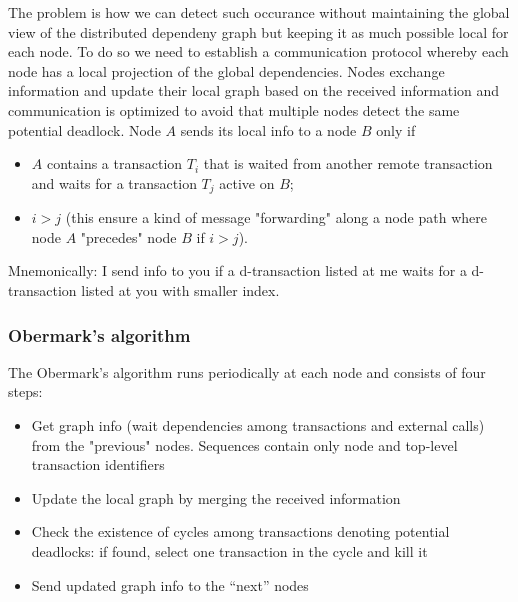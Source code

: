 \newline
The problem is how we can detect such occurance without maintaining the global view of the distributed dependeny graph but keeping it as much possible local for each node. To do so we need to  establish a communication protocol whereby each node has a local projection of the global dependencies. Nodes exchange information and update their local graph based on the received information and communication is optimized to avoid that multiple nodes detect the same potential deadlock.\newline
\newline
Node $A$ sends its local info to a node $B$ only if
\begin{itemize}
    \item $A$ contains a transaction $T_i$ that is waited from another remote transaction and waits for a transaction $T_j$ active on $B$;
    \item $i>j$ (this ensure a kind of message "forwarding" along a node path where node $A$ "precedes" node $B$ if $i>j$).
\end{itemize}
Mnemonically: I send info to you if a d-transaction listed at me waits for a d-transaction listed at you with smaller index.
\subsubsection{Obermark's algorithm}
The Obermark's algorithm runs periodically at each node and consists of four steps:
\begin{itemize}
    \item Get graph info (wait dependencies among transactions
    and external calls) from the "previous" nodes.
    Sequences contain only node and top-level transaction
    identifiers
    \item Update the local graph by merging the received
    information
    \item Check the existence of cycles among transactions
    denoting potential deadlocks: if found, select one
    transaction in the cycle and kill it
    \item Send updated graph info to the “next” nodes
\end{itemize}
